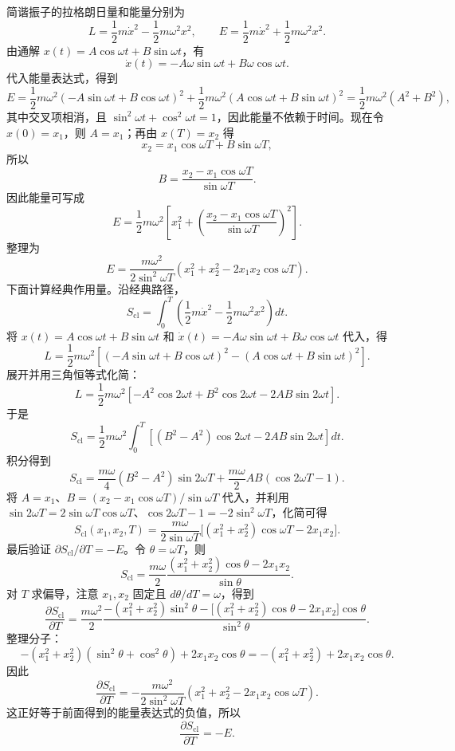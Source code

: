 \begin{solution}
\answer
简谐振子的拉格朗日量和能量分别为
\[
L=\frac{1}{2}m\dot x^2-\frac{1}{2}m\omega^2x^2,\qquad E=\frac{1}{2}m\dot x^2+\frac{1}{2}m\omega^2x^2.
\]
由通解 $x(t)=A\cos\omega t+B\sin\omega t$，有
\[
\dot x(t)=-A\omega\sin\omega t+B\omega\cos\omega t.
\]
代入能量表达式，得到
\[
E=\frac{1}{2}m\omega^2(-A\sin\omega t+B\cos\omega t)^2+\frac{1}{2}m\omega^2(A\cos\omega t+B\sin\omega t)^2
=\frac{1}{2}m\omega^2(A^2+B^2),
\]
其中交叉项相消，且 $\sin^2\omega t+\cos^2\omega t=1$，因此能量不依赖于时间。现在令 $x(0)=x_1$，则 $A=x_1$；再由 $x(T)=x_2$ 得
\[
x_2=x_1\cos\omega T+B\sin\omega T,
\]
所以
\[
B=\frac{x_2-x_1\cos\omega T}{\sin\omega T}.
\]
因此能量可写成
\[
E=\frac{1}{2}m\omega^2\left[x_1^2+\left(\frac{x_2-x_1\cos\omega T}{\sin\omega T}\right)^2\right].
\]
整理为
\[
E=\frac{m\omega^2}{2\sin^2\omega T}\left(x_1^2+x_2^2-2x_1x_2\cos\omega T\right).
\]
下面计算经典作用量。沿经典路径，
\[
S_{\mathrm{cl}}=\int_0^T\left(\frac{1}{2}m\dot x^2-\frac{1}{2}m\omega^2x^2\right)dt.
\]
将 $x(t)=A\cos\omega t+B\sin\omega t$ 和 $\dot x(t)=-A\omega\sin\omega t+B\omega\cos\omega t$ 代入，得
\[
L=\frac{1}{2}m\omega^2\left[(-A\sin\omega t+B\cos\omega t)^2-(A\cos\omega t+B\sin\omega t)^2\right].
\]
展开并用三角恒等式化简：
\[
L=\frac{1}{2}m\omega^2\left[-A^2\cos 2\omega t+B^2\cos 2\omega t-2AB\sin 2\omega t\right].
\]
于是
\[
S_{\mathrm{cl}}
=\frac{1}{2}m\omega^2\int_0^T\left[(B^2-A^2)\cos 2\omega t-2AB\sin 2\omega t\right]dt.
\]
积分得到
\[
S_{\mathrm{cl}}
=\frac{m\omega}{4}(B^2-A^2)\sin 2\omega T+\frac{m\omega}{2}AB(\cos 2\omega T-1).
\]
将 $A=x_1$、$B=(x_2-x_1\cos\omega T)/\sin\omega T$ 代入，并利用 $\sin 2\omega T=2\sin\omega T\cos\omega T$、$\cos 2\omega T-1=-2\sin^2\omega T$，化简可得
\[
S_{\mathrm{cl}}(x_1,x_2,T)=\frac{m\omega}{2\sin\omega T}\bigl[(x_1^2+x_2^2)\cos\omega T-2x_1x_2\bigr].
\]
最后验证 $\partial S_{\mathrm{cl}}/\partial T=-E$。令 $\theta=\omega T$，则
\[
S_{\mathrm{cl}}=\frac{m\omega}{2}\frac{(x_1^2+x_2^2)\cos\theta-2x_1x_2}{\sin\theta}.
\]
对 $T$ 求偏导，注意 $x_1,x_2$ 固定且 $d\theta/dT=\omega$，得到
\[
\frac{\partial S_{\mathrm{cl}}}{\partial T}
=\frac{m\omega^2}{2}\frac{-(x_1^2+x_2^2)\sin^2\theta-\bigl[(x_1^2+x_2^2)\cos\theta-2x_1x_2\bigr]\cos\theta}{\sin^2\theta}.
\]
整理分子：
\[
-(x_1^2+x_2^2)(\sin^2\theta+\cos^2\theta)+2x_1x_2\cos\theta
=-(x_1^2+x_2^2)+2x_1x_2\cos\theta.
\]
因此
\[
\frac{\partial S_{\mathrm{cl}}}{\partial T}
=-\frac{m\omega^2}{2\sin^2\omega T}\left(x_1^2+x_2^2-2x_1x_2\cos\omega T\right).
\]
这正好等于前面得到的能量表达式的负值，所以
\[
\frac{\partial S_{\mathrm{cl}}}{\partial T}=-E.
\]
\end{solution}